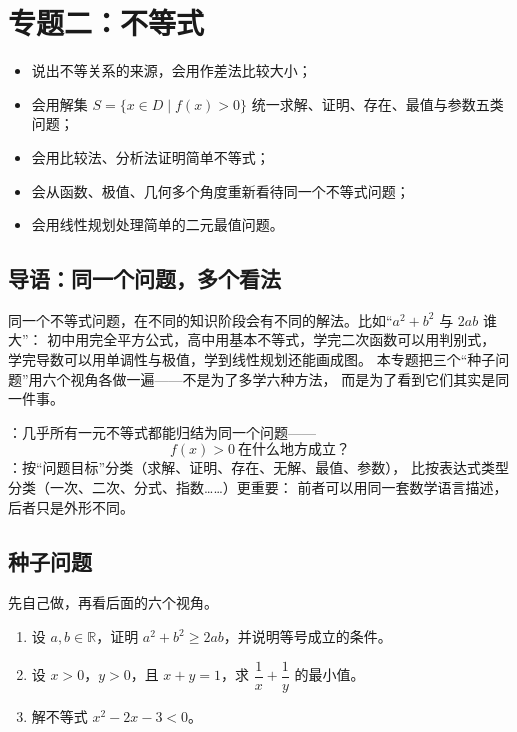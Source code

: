 \section{专题二：不等式}

\begin{learnobjective}
\begin{itemize}
  \item 说出不等关系的来源，会用作差法比较大小；
  \item 会用解集 $S=\{x\in D\mid f(x)>0\}$ 统一求解、证明、存在、最值与参数五类问题；
  \item 会用比较法、分析法证明简单不等式；
  \item 会从函数、极值、几何多个角度重新看待同一个不等式问题；
  \item 会用线性规划处理简单的二元最值问题。
\end{itemize}
\end{learnobjective}

\begin{preview}
\subsection{导语：同一个问题，多个看法}
同一个不等式问题，在不同的知识阶段会有不同的解法。比如“$a^2+b^2$ 与 $2ab$ 谁大”：
初中用完全平方公式，高中用基本不等式，学完二次函数可以用判别式，
学完导数可以用单调性与极值，学到线性规划还能画成图。
本专题把三个“种子问题”用六个视角各做一遍——不是为了多学六种方法，
而是为了看到它们其实是同一件事。

：几乎所有一元不等式都能归结为同一个问题——
\[
  f(x)>0\ \text{在什么地方成立？}
\]
：按“问题目标”分类（求解、证明、存在、无解、最值、参数），
比按表达式类型分类（一次、二次、分式、指数……）更重要：
前者可以用同一套数学语言描述，后者只是外形不同。

\subsection{种子问题}
先自己做，再看后面的六个视角。
\begin{enumerate}
  \item 设 $a,b\in\mathbb{R}$，证明 $a^2+b^2\geq 2ab$，并说明等号成立的条件。
  \item 设 $x>0$，$y>0$，且 $x+y=1$，求 $\dfrac{1}{x}+\dfrac{1}{y}$ 的最小值。
  \item 解不等式 $x^2-2x-3<0$。
\end{enumerate}
\end{preview}

